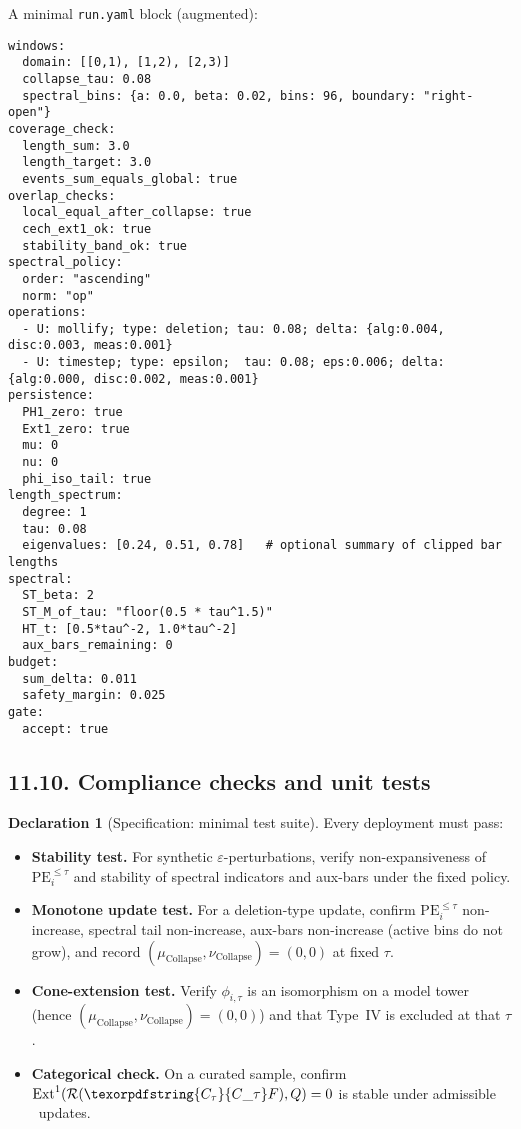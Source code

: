 \documentclass[11pt]{article}
\numberwithin{equation}{section}
\theoremstyle{plain}
\theoremstyle{definition}
\theoremstyle{remark}
\DeclareMathOperator{\Ext}{Ext}
\DeclareRobustCommand{\hyp}{\nobreakdash-}
\newcommand{\Rfun}{\mathcal{R}}
\theoremstyle{plain}
\theoremstyle{definition}
\numberwithin{equation}{section}
\theoremstyle{definition}
\newtheorem{declaration}[theorem]{Declaration}
\DeclareRobustCommand{\Ctau}{\texorpdfstring{\ensuremath{C_{\tau}}}{C\_\tau}}
\DeclareRobustCommand{\muc}{\mu_{\mathrm{Collapse}}}
\DeclareRobustCommand{\nuc}{\nu_{\mathrm{Collapse}}}
\DeclareRobustCommand{\fqi}{\text{f.q.i.}}
\numberwithin{equation}{section}
\theoremstyle{plain}
\theoremstyle{definition}
\theoremstyle{remark}
\providecommand{\Cfun}[1]{\mathsf{C}_{#1}}
\providecommand{\Ctau}{\Cfun{\tau}}
\providecommand{\muc}{\mu_{\mathrm{Collapse}}}
\providecommand{\nuc}{\nu_{\mathrm{Collapse}}}
\begin{document}
\noindent A minimal \texttt{run.yaml} block (augmented):
\begin{verbatim}
windows:
  domain: [[0,1), [1,2), [2,3)]
  collapse_tau: 0.08
  spectral_bins: {a: 0.0, beta: 0.02, bins: 96, boundary: "right-open"}
coverage_check:
  length_sum: 3.0
  length_target: 3.0
  events_sum_equals_global: true
overlap_checks:
  local_equal_after_collapse: true
  cech_ext1_ok: true
  stability_band_ok: true
spectral_policy:
  order: "ascending"
  norm: "op"
operations:
  - U: mollify; type: deletion; tau: 0.08; delta: {alg:0.004, disc:0.003, meas:0.001}
  - U: timestep; type: epsilon;  tau: 0.08; eps:0.006; delta: {alg:0.000, disc:0.002, meas:0.001}
persistence:
  PH1_zero: true
  Ext1_zero: true
  mu: 0
  nu: 0
  phi_iso_tail: true
length_spectrum:
  degree: 1
  tau: 0.08
  eigenvalues: [0.24, 0.51, 0.78]   # optional summary of clipped bar lengths
spectral:
  ST_beta: 2
  ST_M_of_tau: "floor(0.5 * tau^1.5)"
  HT_t: [0.5*tau^-2, 1.0*tau^-2]
  aux_bars_remaining: 0
budget:
  sum_delta: 0.011
  safety_margin: 0.025
gate:
  accept: true
\end{verbatim}

\subsection*{11.10. Compliance checks and unit tests}
\begin{declaration}[Specification: minimal test suite]\label{spec:11-tests}
Every deployment must pass:
\begin{itemize}
  \item \textbf{Stability test.} For synthetic $\varepsilon$-perturbations, verify non\hyp expansiveness of $\mathrm{PE}_{i}^{\le \tau}$ and stability of spectral indicators and aux-bars under the fixed policy.
  \item \textbf{Monotone update test.} For a deletion-type update, confirm $\mathrm{PE}_{i}^{\le \tau}$ non-increase, spectral tail non-increase, aux-bars non-increase (active bins do not grow), and record $(\muc,\nuc)=(0,0)$ at fixed $\tau$.
  \item \textbf{Cone-extension test.} Verify $\phi_{i,\tau}$ is an isomorphism on a model tower (hence $(\muc,\nuc)=(0,0)$) and that Type~IV is excluded at that $\tau$.
  \item \textbf{Categorical check.} On a curated sample, confirm $\Ext^1(\Rfun(\Ctau F),Q)=0$ is stable under admissible \fqi\ updates.
\end{itemize}
\end{declaration}
\end{document}
